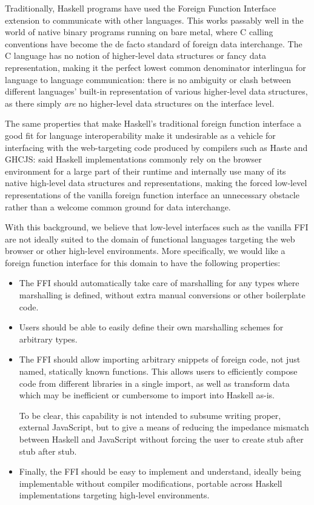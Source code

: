 \documentclass[preprint]{sigplanconf}
\begin{document}
Traditionally, Haskell programs have used the Foreign Function Interface
extension to communicate with other languages. This works
passably well in the world of native binary programs running on bare metal,
where C calling conventions have become the de facto standard of foreign
data interchange.
The C language has no notion of higher-level data structures or
fancy data representation, making it the perfect lowest common denominator
interlingua for language to language communication:
there is no ambiguity or clash between different languages' built-in
representation of various higher-level data structures, as there simply
\emph{are} no higher-level data structures on the interface level.

The same properties that make Haskell's traditional foreign function interface
a good fit for language interoperability make it undesirable as a vehicle for
interfacing with the web-targeting code produced by compilers such as Haste
and GHCJS: said Haskell implementations commonly rely on the browser environment
for a large part of their runtime and internally use many of its native
high-level data structures and representations, making the forced low-level
representations of the vanilla foreign function interface an unnecessary
obstacle rather than a welcome common ground for data interchange.

With this background, we believe that low-level interfaces such as the
vanilla FFI are not ideally suited to the domain of functional languages
targeting the web browser or other high-level environments.
More specifically, we would like a foreign function interface for this domain
to have the following properties:

\begin{itemize}
\item
  The FFI should automatically take care of marshalling for any types where
  marshalling is defined, without extra manual conversions or other
  boilerplate code.
\item
  Users should be able to easily define their own marshalling schemes for
  arbitrary types.
\item
  The FFI should allow importing arbitrary snippets of foreign code, not just
  named, statically known functions. This allows users to efficiently compose
  code from different libraries in a single import,
  as well as transform data which may be inefficient or cumbersome to import
  into Haskell as-is.

  To be clear, this capability is not intended to subsume writing proper,
  external JavaScript, but to give a means of reducing the impedance mismatch
  between Haskell and JavaScript without forcing the user to create stub after
  stub after stub.
\item
  Finally, the FFI should be easy to implement and understand, ideally being
  implementable without compiler modifications, portable across Haskell
  implementations targeting high-level environments.
\end{itemize}
\end{document}
